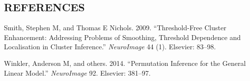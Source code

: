 \documentclass[]{article}
\begin{document}
\subsection*{REFERENCES}\label{references}

\hypertarget{refs}{}
\hypertarget{ref-smith2009}{}
Smith, Stephen M, and Thomas E Nichols. 2009. ``Threshold-Free Cluster
Enhancement: Addressing Problems of Smoothing, Threshold Dependence and
Localisation in Cluster Inference.'' \emph{NeuroImage} 44 (1). Elsevier:
83--98.

\hypertarget{ref-winkler2014}{}
Winkler, Anderson M, and others. 2014. ``Permutation Inference for the
General Linear Model.'' \emph{NeuroImage} 92. Elsevier: 381--97.
\end{document}
